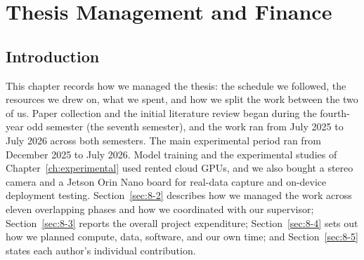 \chapter{Thesis Management and Finance}
\label{ch:management}

\section{Introduction}
This chapter records how we managed the thesis: the schedule we followed,
the resources we drew on, what we spent, and how we split the work
between the two of us. Paper collection and the initial literature
review began during the fourth-year odd semester (the seventh semester),
and the work ran from July 2025 to July 2026 across both semesters. The
main experimental period ran from December 2025 to July 2026. Model
training and the experimental studies
of Chapter~\ref{ch:experimental} used rented cloud GPUs, and we also
bought a stereo camera and a Jetson Orin Nano board for real-data
capture and on-device deployment testing. Section~\ref{sec:8-2}
describes how we managed the work across eleven overlapping phases and
how we coordinated with our supervisor; Section~\ref{sec:8-3} reports
the overall project expenditure; Section~\ref{sec:8-4} sets out how we
planned compute, data, software, and our own time; and
Section~\ref{sec:8-5} states each author's individual contribution.


